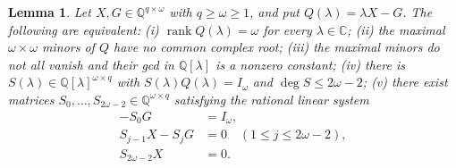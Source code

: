 \documentclass[journal]{IEEEtran}
\theoremstyle{plainn}
\newtheorem{lem}[thm]{Lemma}
\theoremstyle{remark}
\begin{document}
\begin{lem}\label{lem:zero}
Let $X,G\in\mathbb Q^{q\times\omega}$ with $q\ge\omega\ge1$, and put
$Q(\lambda)=\lambda X-G$. The following are equivalent:
\emph{(i)} $\operatorname{rank}Q(\lambda)=\omega$ for every
$\lambda\in\mathbb C$;
\emph{(ii)} the maximal $\omega\times\omega$ minors of $Q$ have no common
complex root;
\emph{(iii)} the maximal minors do not all vanish and their gcd in
$\mathbb Q[\lambda]$ is a nonzero constant;
\emph{(iv)} there is $S(\lambda)\in\mathbb Q[\lambda]^{\omega\times q}$ with
$S(\lambda)Q(\lambda)=I_\omega$ and $\deg S\le2\omega-2$;
\emph{(v)} there exist matrices
$S_0,\dots,S_{2\omega-2}\in\mathbb Q^{\omega\times q}$ satisfying the rational
linear system
\begin{equation}
\tag{R0}\label{eq:R0}
\begin{aligned}
-S_0G&=I_\omega,\\
S_{j-1}X-S_jG&=0\quad(1\le j\le2\omega-2),\\
S_{2\omega-2}X&=0 .
\end{aligned}
\end{equation}
\end{lem}
\end{document}
